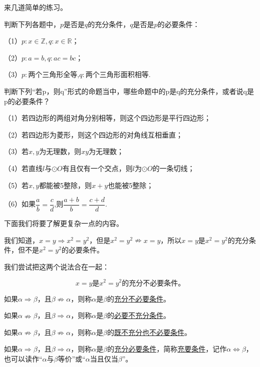 \documentclass[lang=cn,math=cm,chinesefont=nofont,11pt,scheme=chinese,onecol]{elegantbook}
\begin{document}
来几道简单的练习。

\begin{exercise}\label{202406262010}
  判断下列各题中，$p$是否是$q$的充分条件，$q$是否是$p$的必要条件：

  （1）$p:x\in\mathbb{Z},q:x\in\mathbb{R}$；

  （2）$p:a=b,q:ac=bc$；

  （3）$p:$两个三角形全等,$q:$两个三角形面积相等.
\end{exercise}

\begin{exercise}\label{202406262101}
  判断下列“若p，则q”形式的命题当中，哪些命题中的p是q的充分条件，或者说q是p的必要条件？

  （1）若四边形的两组对角分别相等，则这个四边形是平行四边形；

  （2）若四边形为菱形，则这个四边形的对角线互相垂直；

  （3）若$x,y$为无理数，则$xy$为无理数；

  （4）若直线$l$与$\odot O$有且仅有一个交点，则$l$为$\odot O$的一条切线；

  （5）若$x,y$都能被5整除，则$x+y$也能被5整除；

  \begin{spacing}{2.0}
    （6）如果$\dfrac{a}{b}=\dfrac{c}{d}$,则$\dfrac{a+b}{b}=\dfrac{c+d}{d}$.
  \end{spacing}
\end{exercise}

\hspace*{\fill}

下面我们将要了解更复杂一点的内容。

我们知道，$x=y\Rightarrow x^2=y^2$，但是$x^2=y^2\nRightarrow x=y$，所以$x=y$是$x^2=y^2$的充分条件，但不是$x^2=y^2$的必要条件。

我们尝试把这两个说法合在一起：

$$x=y\text{是}x^2=y^2\text{的}\textbf{充分不必要条件。}$$

\begin{definition}
  如果$\alpha\Rightarrow\beta$，且$\beta\nRightarrow\alpha$，则称$\alpha$是$\beta$的\underline{充分不必要条件}。

  如果$\alpha\nRightarrow\beta$，且$\beta\Rightarrow\alpha$，则称$\alpha$是$\beta$的\underline{必要不充分条件}。

  如果$\alpha\nRightarrow\beta$，且$\beta\nRightarrow\alpha$，则称$\alpha$是$\beta$的\underline{既不充分也不必要条件}。

  如果$\alpha\Rightarrow\beta$，且$\beta\Rightarrow\alpha$，则称$\alpha$是$\beta$的\underline{充分必要条件}，简称\underline{充要条件}，记作$\alpha\Leftrightarrow\beta$，也可以读作“$\alpha$与$\beta$等价”或“$\alpha$当且仅当$\beta$”。
\end{definition}
\end{document}
